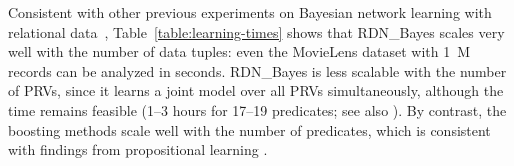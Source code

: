 \documentclass[runningheads,a4paper]{llncs}
\begin{document}
%  
%
%
%  
Consistent with other previous experiments on Bayesian network learning with relational data~\cite{Khosravi2010,Schulte2012}, Table~\ref{table:learning-times} shows that RDN\_Bayes scales very well with the number of data tuples: even the MovieLens dataset with 1~M records can be analyzed in seconds. 
RDN\_Bayes is less scalable with the number of PRVs, since it learns a joint model over all PRVs simultaneously,  although the time  remains feasible (1--3 hours for 17--19 predicates; see also \cite{Schulte2012}). By contrast, the boosting methods scale well with the number of predicates, which is consistent with findings from  propositional learning \cite{Heckerman2000}.
\end{document}
